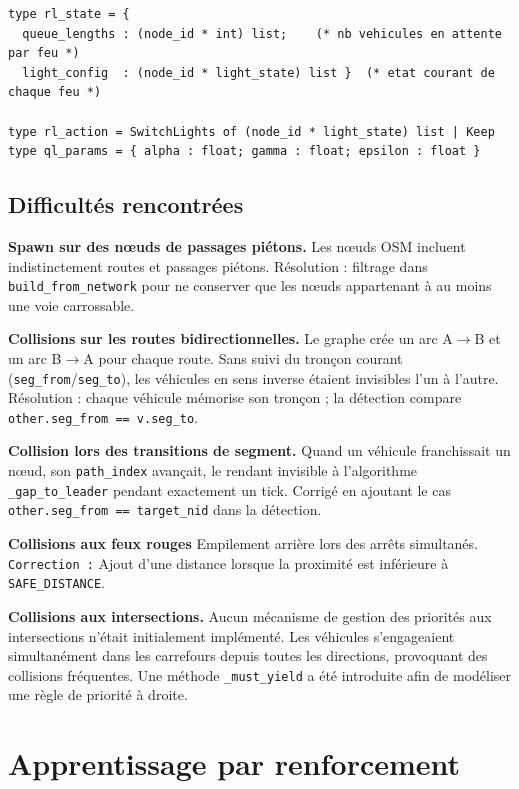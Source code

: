 \documentclass[a4paper,10pt]{article}
\begin{document}
\begin{lstlisting}
type rl_state = {
  queue_lengths : (node_id * int) list;    (* nb vehicules en attente par feu *)
  light_config  : (node_id * light_state) list }  (* etat courant de chaque feu *)

type rl_action = SwitchLights of (node_id * light_state) list | Keep
type ql_params = { alpha : float; gamma : float; epsilon : float }
\end{lstlisting}

\subsection{Difficultés rencontrées}

\textbf{Spawn sur des nœuds de passages piétons.}
Les nœuds OSM incluent indistinctement routes et passages piétons.
Résolution : filtrage dans \texttt{build\_from\_network} pour ne conserver
que les nœuds appartenant à au moins une voie carrossable.


\textbf{Collisions sur les routes bidirectionnelles.}
Le graphe crée un arc A$\to$B et un arc B$\to$A pour chaque route.
Sans suivi du tronçon courant (\texttt{seg\_from}/\texttt{seg\_to}),
les véhicules en sens inverse étaient invisibles l'un à l'autre.
Résolution : chaque véhicule mémorise son tronçon ; la détection
compare \texttt{other.seg\_from == v.seg\_to}.

\textbf{Collision lors des transitions de segment.}
Quand un véhicule franchissait un nœud, son \texttt{path\_index}
avançait, le rendant invisible à l'algorithme \texttt{\_gap\_to\_leader}
pendant exactement un tick. Corrigé en ajoutant le cas
\texttt{other.seg\_from == target\_nid} dans la détection.

\textbf{Collisions aux feux rouges}
Empilement arrière lors des arrêts simultanés. \texttt{Correction :}
Ajout d'une distance lorsque la proximité est inférieure à \texttt{SAFE\_DISTANCE}.

\textbf{Collisions aux intersections.}
Aucun mécanisme de gestion des priorités aux intersections n'était initialement implémenté.
Les véhicules s'engageaient simultanément dans les carrefours depuis toutes les directions,
provoquant des collisions fréquentes.
Une méthode \texttt{\_must\_yield} a été introduite afin de modéliser une règle de priorité à droite.


\section{Apprentissage par renforcement}
\end{document}
